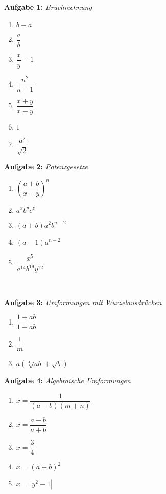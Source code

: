 
\begin{minipage}[t]{0.6\linewidth}
    \textbf{Aufgabe 1: } \emph{Bruchrechnung}
    \begin{enumerate}[label=(\alph*)]
        \item $b-a$
        \item $\dfrac{a}{b}$
        \item $\dfrac{x}{y}-1$
        \item $\dfrac{n^2}{n-1}$
        \item $\dfrac{x+y}{x-y}$
        \item $1$
        \item $\dfrac{a^2}{\sqrt{2}}$
    \end{enumerate}
\end{minipage}
\hfill
\begin{minipage}[t]{0.37\linewidth}
    \textbf{Aufgabe 2: } \emph{Potenzgesetze}
    \begin{enumerate}[label=(\alph*)]
        \item $\left( \dfrac{a+b}{x-y} \right) ^n$
        \item $a^xb^yc^z$
        \item $(a+b)a^2b^{n-2}$
        \item $(a-1)a^{n-2}$
        \item $\dfrac{x^5}{a^{14}b^{19}y^{12}}$
    \end{enumerate}
\end{minipage}\\[2cm]
%
\begin{minipage}[t]{0.6\linewidth}
\textbf{Aufgabe 3: } \emph{Umformungen mit Wurzelausdrücken}
    \begin{enumerate}[label=(\alph*)]
        \item $\dfrac{1+ab}{1-ab}$
        \item $\dfrac{1}{m}$
        \item $a\left(\sqrt[4]{ab}+\sqrt{b}\right)$
    \end{enumerate}
\end{minipage}
\hfill
%
\begin{minipage}[t]{0.4\linewidth}
\textbf{Aufgabe 4: } \emph{Algebraische Umformungen}
    \begin{enumerate}[label=(\alph*)]
        \item $x=\dfrac{1}{(a-b)(m+n)}$
        \item $x=\dfrac{a-b}{a+b}$
        \item $x=\dfrac{3}{4}$
        \item $x=(a+b)^2$
        \item $x=\left|y^2-1\right|$
    \end{enumerate}
\end{minipage}